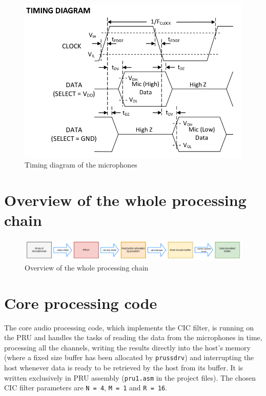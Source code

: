 \documentclass[]{report}
\begin{document}
\begin{figure}[h]
\centering
\includegraphics[width=0.6\linewidth]{Pictures/timing_diagram.png}
\caption{Timing diagram of the microphones}
\end{figure}


\hypertarget{overview-of-the-whole-processing-chain}{%
\section{Overview of the whole processing
chain}\label{overview-of-the-whole-processing-chain}}

\begin{figure}[H]
\centering
\includegraphics[width=1.0\linewidth]{Pictures/PRU_processing_chain.png}
\caption{Overview of the whole processing chain}
\end{figure}

\hypertarget{core-processing-code}{%
\section{Core processing code}\label{core-processing-code}}

The core audio processing code, which implements the CIC filter, is running on the PRU and handles the tasks of reading the data from the microphones in time, processing all the channels, writing the results directly into the host's memory (where a fixed size buffer has been allocated by \texttt{prussdrv}) and interrupting the host whenever data is ready to be retrieved by the host from its buffer. It is written exclusively in PRU assembly (\texttt{pru1.asm} in the project files). The chosen CIC filter parameters are \texttt{N~=~4}, \texttt{M = 1} and \texttt{R = 16}.
\end{document}
